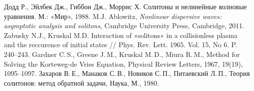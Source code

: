 \documentclass[12pt, a4paper]{report}
\begin{document}
\begin{thebibliography}{99}
	 Додд Р., Эйлбек Дж., Гиббон Дж., Моррис Х. Солитоны и нелинейные волновые уравнения. М.: «Мир», 1988.
	 M.J. Ablowitz, \textit{Nonlinear dispersive waves: asymptotic analysis and solitons}, Cambridge University Press, Cambridge, 2011.
	 Zabusky N.J., Kruskal M.D. Interaction of «solitons» in a collisionless plasma and the reccurence of initial states // Phys. Rev. Lett. 1965.	Vol. 15, No 6. P. 240–243.
	 Gardner C.\,S., Greene J.\,M., Kruskal M.\,D., Miura R.\,M., Method for Solving the Korteweg-de Vries Equation, Physical Review Letters, 1967, 19(19), 1095--1097.
	 Захаров В.\,Е., Манаков С.\,В., Новиков С.\,П., Питаевский Л.\,П., Теория солитонов: метод обратной задачи, Наука, М., 1980. 
	

\end{thebibliography}
\end{document}
